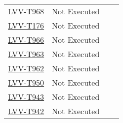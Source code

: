 \documentclass[DM,lsstdraft,STR,toc]{lsstdoc}
\begin{document}
\begin{longtable}{p{2cm}p{2.5cm}p{9cm}p{2.5cm}}
\begin{minipage}[]{9cm}
    \medskip
    \end{minipage}
    &
    \\\hline
\href{https://jira.lsstcorp.org/secure/Tests.jspa#/testCase/LVV-T968}{LVV-T968}
    & Not Executed &
    \begin{minipage}[]{9cm}
    \smallskip
    
    \medskip
    \end{minipage}
    &
    \\\hline
\href{https://jira.lsstcorp.org/secure/Tests.jspa#/testCase/LVV-T176}{LVV-T176}
    & Not Executed &
    \begin{minipage}[]{9cm}
    \smallskip
    
    \medskip
    \end{minipage}
    &
    \\\hline
\href{https://jira.lsstcorp.org/secure/Tests.jspa#/testCase/LVV-T966}{LVV-T966}
    & Not Executed &
    \begin{minipage}[]{9cm}
    \smallskip
    
    \medskip
    \end{minipage}
    &
    \\\hline
\href{https://jira.lsstcorp.org/secure/Tests.jspa#/testCase/LVV-T963}{LVV-T963}
    & Not Executed &
    \begin{minipage}[]{9cm}
    \smallskip
    
    \medskip
    \end{minipage}
    &
    \\\hline
\href{https://jira.lsstcorp.org/secure/Tests.jspa#/testCase/LVV-T962}{LVV-T962}
    & Not Executed &
    \begin{minipage}[]{9cm}
    \smallskip
    
    \medskip
    \end{minipage}
    &
    \\\hline
\href{https://jira.lsstcorp.org/secure/Tests.jspa#/testCase/LVV-T950}{LVV-T950}
    & Not Executed &
    \begin{minipage}[]{9cm}
    \smallskip
    
    \medskip
    \end{minipage}
    &
    \\\hline
\href{https://jira.lsstcorp.org/secure/Tests.jspa#/testCase/LVV-T943}{LVV-T943}
    & Not Executed &
    \begin{minipage}[]{9cm}
    \smallskip
    
    \medskip
    \end{minipage}
    &
    \\\hline
\href{https://jira.lsstcorp.org/secure/Tests.jspa#/testCase/LVV-T942}{LVV-T942}
    & Not Executed &
    \begin{minipage}[]{9cm}
    \smallskip
    

\end{minipage}
\end{longtable}
\end{document}
